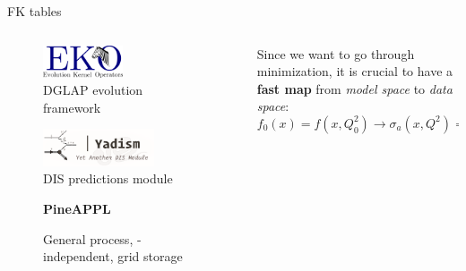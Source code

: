 \documentclass[9pt]{beamer}
\begin{document}
\begin{frame}{FK tables}
    \vspace*{20pt}
    \begin{columns}
        \begin{column}{0.5\textwidth}
            \begin{figure}
                \centering
                \includegraphics[width=0.5\textwidth]{eko}
                \caption*{DGLAP evolution framework}
            \end{figure}
            \vspace*{10pt}

            \begin{figure}
                \includegraphics[width=0.7\textwidth]{yadism}
                \caption*{DIS predictions module}
            \end{figure}
            \vspace*{10pt}

            \begin{figure}
                {\Huge \textbf{PineAPPL}}
                \caption*{General process, \pdf-independent, grid storage}
            \end{figure}
        \end{column}
        \begin{column}{0.5\textwidth}
            Since we want to go through minimization, it is crucial to have a
            \textbf{fast map} from \textit{model space} to \textit{data space}:
            \begin{equation*}
                f_0(x) = f(x, Q_0^2) \to \sigma_a(x, Q^2) = \hat{\sigma}_a(Q^2)
                \otimes f(Q^2) \otimes f(Q^2)
            \end{equation*}
            \vspace*{5pt}


\end{column}
\end{columns}
\end{frame}
\end{document}
